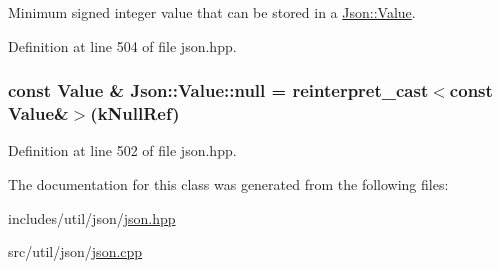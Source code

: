 Minimum signed integer value that can be stored in a \hyperlink{class_json_1_1_value}{Json\-::\-Value}. 



Definition at line 504 of file json.\-hpp.

\hypertarget{class_json_1_1_value_a6d6e9ea6807e46d5b7ded66d3032f607}{
\subsubsection[{null}]{\setlength{\rightskip}{0pt plus 5cm}const {\bf Value} \& Json\-::\-Value\-::null = reinterpret\-\_\-cast$<$const {\bf Value}\&$>$({\bf k\-Null\-Ref})\hspace{0.3cm}{\ttfamily [static]}}}\label{class_json_1_1_value_a6d6e9ea6807e46d5b7ded66d3032f607}


Definition at line 502 of file json.\-hpp.



The documentation for this class was generated from the following files\-:\begin{DoxyCompactItemize}
\item 
includes/util/json/\hyperlink{json_8hpp}{json.\-hpp}\item 
src/util/json/\hyperlink{json_8cpp}{json.\-cpp}\end{DoxyCompactItemize}
